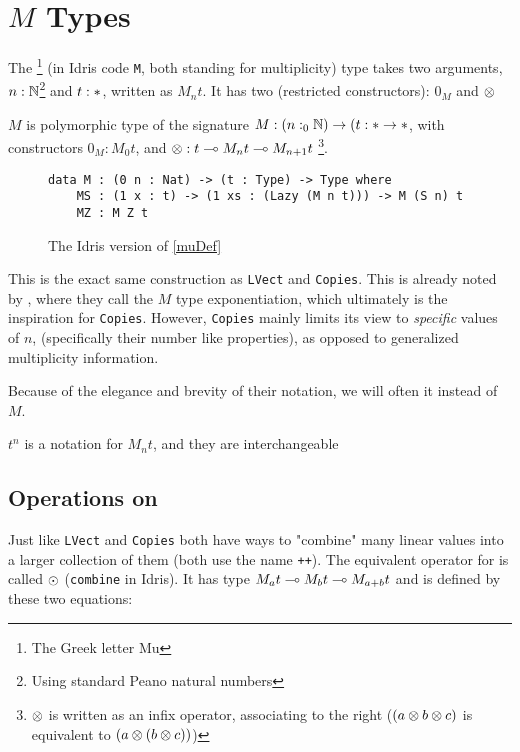 \section{$M$ Types}

The \tmu \footnote{The Greek letter Mu} (in Idris code \verb|M|, both standing for multiplicity) type takes two arguments, $n : \mathbb{N}$\footnote{Using standard Peano natural numbers} and $t : \ast$, written as $M_n t$. 
It has two (restricted constructors): $0_M$ and $\otimes$

\begin{definition}
	\label{muDef}
	$M$ is polymorphic type of the signature $M : (n :_0 \mathbb{N}) \to (t : \ast \to \ast$, with constructors $0_M : M_0 t$, and $\otimes : t \multimap M_n t \multimap M_{n+1} t$ \footnote{$\otimes$ is written as an infix operator, associating to the right ($(a \otimes b \otimes c)$ is equivalent to $(a \otimes (b \otimes c))$)}.
\end{definition}

\begin{figure}
	\begin{verbatim}
data M : (0 n : Nat) -> (t : Type) -> Type where
	MS : (1 x : t) -> (1 xs : (Lazy (M n t))) -> M (S n) t
	MZ : M Z t
	\end{verbatim}
	The Idris version of \ref{muDef}
\end{figure}

This is the exact same construction as \verb|LVect|\cite{idris_linear_lvect} and \verb|Copies|\cite{idris_linear_copies}.
This is already noted by \citeauthor{inverse_of_type}, where they call the $M$ type exponentiation, which ultimately is the inspiration for \verb|Copies|. 
However, \verb|Copies| mainly limits its view to \emph{specific} values of $n$, (specifically their number like properties), as opposed to generalized multiplicity information.

Because of the elegance and brevity of their notation, we will often it instead of $M$.
\begin{note}
	$t^n$ is a notation for $M_n t$, and they are interchangeable
\end{note}
\subsection{Operations on \tmu}

Just like \verb|LVect| and \verb|Copies| both have ways to "combine" many linear values into a larger collection of them (both use the name \verb|++|). 
The equivalent operator for \tmu is called $\odot$ (\verb|combine| in Idris). 
It has type $M_a t \multimap M_b t \multimap M_{a + b} t$ and is defined by these two equations:

